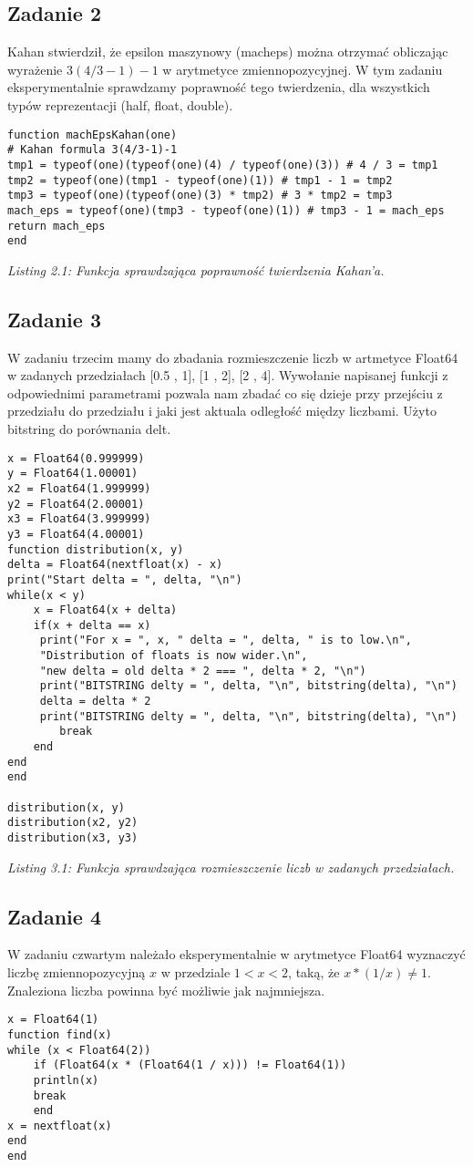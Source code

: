 \documentclass[]{article}
\begin{document}
\subsection{Zadanie 2}
Kahan stwierdził, że epsilon maszynowy (macheps) można otrzymać obliczając wyrażenie
\(3(4/3-1)-1\) w arytmetyce zmiennopozycyjnej. W tym zadaniu eksperymentalnie sprawdzamy poprawność tego twierdzenia, dla wszystkich typów reprezentacji (half, float, double).
\newpage
\begin{lstlisting}
function machEpsKahan(one)
# Kahan formula 3(4/3-1)-1 
tmp1 = typeof(one)(typeof(one)(4) / typeof(one)(3)) # 4 / 3 = tmp1
tmp2 = typeof(one)(tmp1 - typeof(one)(1)) # tmp1 - 1 = tmp2
tmp3 = typeof(one)(typeof(one)(3) * tmp2) # 3 * tmp2 = tmp3
mach_eps = typeof(one)(tmp3 - typeof(one)(1)) # tmp3 - 1 = mach_eps
return mach_eps
end
\end{lstlisting}
\textit{Listing 2.1: Funkcja sprawdzająca poprawność twierdzenia Kahan'a.}
\subsection{Zadanie 3}
W zadaniu trzecim mamy do zbadania rozmieszczenie liczb w artmetyce Float64 w zadanych przedziałach [0.5 , 1], [1 , 2], [2 , 4]. Wywołanie napisanej funkcji z odpowiednimi parametrami pozwala nam zbadać co się dzieje przy przejściu z przedziału do przedziału i jaki jest aktuala odległość między liczbami. Użyto bitstring do porównania delt.
\begin{lstlisting}
x = Float64(0.999999)
y = Float64(1.00001)
x2 = Float64(1.999999)
y2 = Float64(2.00001)
x3 = Float64(3.999999)
y3 = Float64(4.00001)
function distribution(x, y)
delta = Float64(nextfloat(x) - x)
print("Start delta = ", delta, "\n")
while(x < y)
	x = Float64(x + delta)
	if(x + delta == x)            
	 print("For x = ", x, " delta = ", delta, " is to low.\n",
	 "Distribution of floats is now wider.\n",
	 "new delta = old delta * 2 === ", delta * 2, "\n")
	 print("BITSTRING delty = ", delta, "\n", bitstring(delta), "\n")
	 delta = delta * 2
	 print("BITSTRING delty = ", delta, "\n", bitstring(delta), "\n")
		break
	end
end
end

distribution(x, y) 
distribution(x2, y2) 
distribution(x3, y3) 
\end{lstlisting}
\textit{Listing 3.1: Funkcja sprawdzająca rozmieszczenie liczb w zadanych przedziałach.}
\subsection{Zadanie 4}
W zadaniu czwartym należało eksperymentalnie w arytmetyce Float64 wyznaczyć liczbę zmiennopozycyjną \(x\) w przedziale \(1 < x < 2\), taką, że \(x*(1/x) \not = 1\). Znaleziona liczba powinna być możliwie jak najmniejsza.
\begin{lstlisting}
x = Float64(1)
function find(x)
while (x < Float64(2))
	if (Float64(x * (Float64(1 / x))) != Float64(1))
	println(x)
	break
	end
x = nextfloat(x)
end
end
\end{lstlisting}
\end{document}
